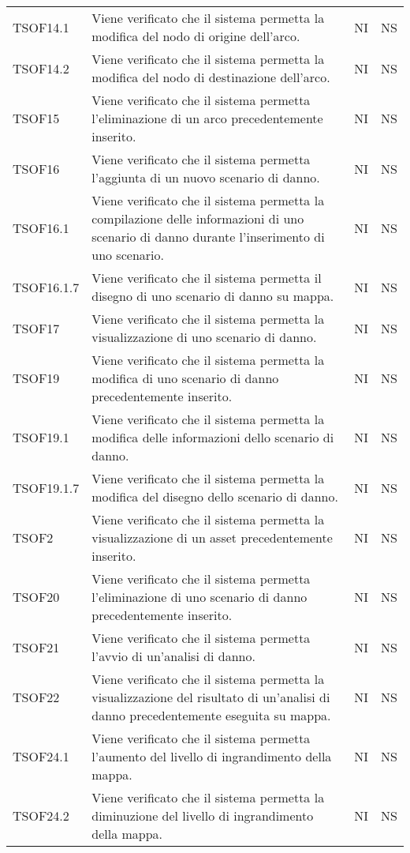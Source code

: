 \begin{longtable}{p{1.5cm}!{\VRule[1pt]}p{5cm}!{\VRule[1pt]}p{1cm}!{\VRule[1pt]}p{1cm}}
			TSOF14.1 & Viene verificato che il sistema permetta la modifica del nodo di origine dell'arco. & NI & NS \\ 
			TSOF14.2 & Viene verificato che il sistema permetta la modifica del nodo di destinazione dell'arco. & NI & NS \\ 
			TSOF15 & Viene verificato che il sistema permetta l'eliminazione di un arco precedentemente inserito. & NI & NS \\ 
			TSOF16 & Viene verificato che il sistema permetta l'aggiunta di un nuovo scenario di danno. & NI & NS \\ 
			TSOF16.1 & Viene verificato che il sistema permetta la compilazione delle informazioni di uno scenario di danno durante l'inserimento di uno scenario. & NI & NS \\ 
			TSOF16.1.7 & Viene verificato che il sistema permetta il disegno di uno scenario di danno su mappa. & NI & NS \\ 
			TSOF17 & Viene verificato che il sistema permetta la visualizzazione di uno scenario di danno. & NI & NS \\ 
			TSOF19 & Viene verificato che il sistema permetta la modifica di uno scenario di danno precedentemente inserito. & NI & NS \\ 
			TSOF19.1 & Viene verificato che il sistema permetta la modifica delle informazioni dello scenario di danno. & NI & NS \\ 
			TSOF19.1.7 & Viene verificato che il sistema permetta la modifica del disegno dello scenario di danno. & NI & NS \\ 
			TSOF2 & Viene verificato che il sistema permetta la visualizzazione di un asset precedentemente inserito. & NI & NS \\ 
			TSOF20 & Viene verificato che il sistema permetta l'eliminazione di uno scenario di danno precedentemente inserito. & NI & NS \\ 
			TSOF21 & Viene verificato che il sistema permetta l'avvio di un'analisi di danno. & NI & NS \\ 
			TSOF22 & Viene verificato che il sistema permetta la visualizzazione del risultato di un'analisi di danno precedentemente eseguita su mappa. & NI & NS \\ 
			TSOF24.1 & Viene verificato che il sistema permetta l'aumento del livello di ingrandimento della mappa. & NI & NS \\ 
			TSOF24.2 & Viene verificato che il sistema permetta la diminuzione del livello di ingrandimento della mappa. & NI & NS \\ 

\end{longtable}
